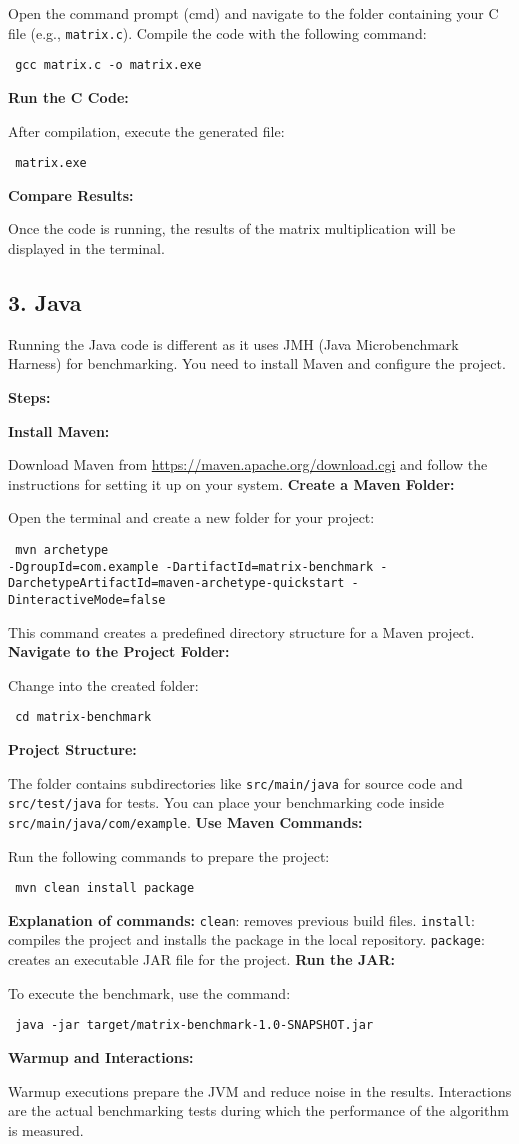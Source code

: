 \documentclass{article} \usepackage{hyperref}
\begin{document}
Open the command prompt (cmd) and navigate to the folder containing your C file (e.g., \texttt{matrix.c}). Compile the code with the following command: \begin{verbatim} gcc matrix.c -o matrix.exe \end{verbatim}
\textbf{Run the C Code:}

After compilation, execute the generated file: \begin{verbatim} matrix.exe \end{verbatim}
\textbf{Compare Results:}

Once the code is running, the results of the matrix multiplication will be displayed in the terminal.
\subsection{3. Java} Running the Java code is different as it uses JMH (Java Microbenchmark Harness) for benchmarking. You need to install Maven and configure the project.

\textbf{Steps:}

\textbf{Install Maven:}

Download Maven from \url{https://maven.apache.org/download.cgi} and follow the instructions for setting it up on your system.
\textbf{Create a Maven Folder:}

Open the terminal and create a new folder for your project: \begin{verbatim} mvn archetype
-DgroupId=com.example -DartifactId=matrix-benchmark -DarchetypeArtifactId=maven-archetype-quickstart -DinteractiveMode=false \end{verbatim}
This command creates a predefined directory structure for a Maven project.
\textbf{Navigate to the Project Folder:}

Change into the created folder: \begin{verbatim} cd matrix-benchmark \end{verbatim}
\textbf{Project Structure:}

The folder contains subdirectories like \texttt{src/main/java} for source code and \texttt{src/test/java} for tests. You can place your benchmarking code inside \texttt{src/main/java/com/example}.
\textbf{Use Maven Commands:}

Run the following commands to prepare the project: \begin{verbatim} mvn clean install package \end{verbatim}
\textbf{Explanation of commands:}
\texttt{clean}: removes previous build files.
\texttt{install}: compiles the project and installs the package in the local repository.
\texttt{package}: creates an executable JAR file for the project.
\textbf{Run the JAR:}

To execute the benchmark, use the command: \begin{verbatim} java -jar target/matrix-benchmark-1.0-SNAPSHOT.jar \end{verbatim}
\textbf{Warmup and Interactions:}

Warmup executions prepare the JVM and reduce noise in the results. Interactions are the actual benchmarking tests during which the performance of the algorithm is measured.
\end{document}
